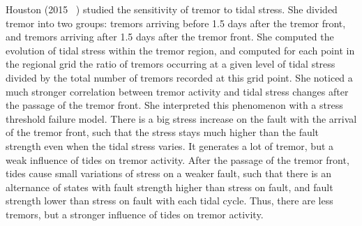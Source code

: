 \documentclass[main.tex]{subfiles}
\begin{document}
Houston (2015 ~\cite{HOU_2015}) studied the sensitivity of tremor to tidal stress. She divided tremor into two groups: tremors arriving before 1.5 days after the tremor front, and tremors arriving after 1.5 days after the tremor front. She computed the evolution of tidal stress within the tremor region, and computed for each point in the regional grid the ratio of tremors occurring at a given level of tidal stress divided by the total number of tremors recorded at this grid point. She noticed a much stronger correlation between tremor activity and tidal stress changes after the passage of the tremor front. She interpreted this phenomenon with a stress threshold failure model. There is a big stress increase on the fault with the arrival of the tremor front, such that the stress stays much higher than the fault strength even when the tidal stress varies. It generates a lot of tremor, but a weak influence of tides on tremor activity. After the passage of the tremor front, tides cause small variations of stress on a weaker fault, such that there is an alternance of states with fault strength higher than stress on fault, and fault strength lower than stress on fault with each tidal cycle. Thus, there are less tremors, but a stronger influence of tides on tremor activity. \\
\end{document}
